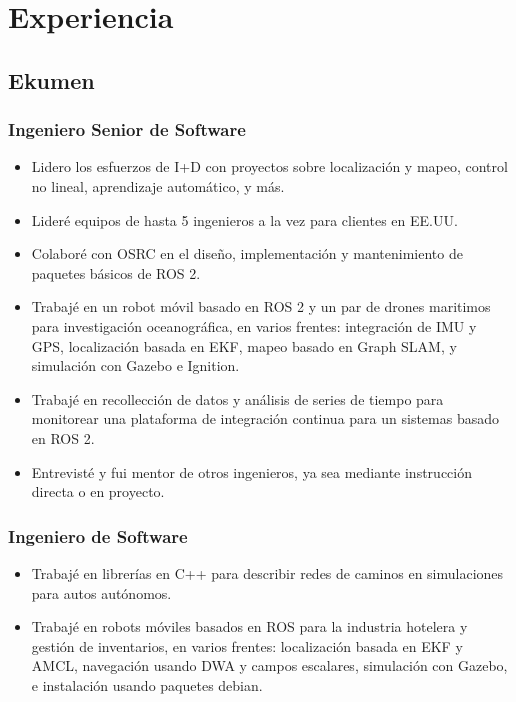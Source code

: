 \documentclass[spanish, letterpaper]{resume}
\renewcommand{\date}[2]{%
  \DTMspanishMonthname{#2} #1}
\begin{document}
\section*{Experiencia}

\subsection*[\icon{ekumen}]{Ekumen }

\subsubsection*{Ingeniero Senior de Software \thru{\date{2018}{9}}{Present}}
\begin{itemize}
  \item Lidero los esfuerzos de I+D con proyectos sobre localización y mapeo, control no lineal, aprendizaje automático, y más.
  \item Lideré equipos de hasta 5 ingenieros a la vez para clientes en EE.UU.
  \item Colaboré con OSRC en el diseño, implementación y mantenimiento de paquetes básicos de ROS 2.
  \item Trabajé en un robot móvil basado en ROS 2 y un par de drones maritimos para investigación oceanográfica, en varios frentes: integración de IMU y GPS, localización basada en EKF, mapeo basado en Graph SLAM, y simulación con Gazebo e Ignition.
  \item Trabajé en recollección de datos y análisis de series de tiempo para monitorear una plataforma de integración continua para un sistemas basado en ROS 2.
  \item Entrevisté y fui mentor de otros ingenieros, ya sea mediante instrucción directa o en proyecto.
\end{itemize}

\subsubsection*{Ingeniero de Software \thru{\date{2015}{8}}{\date{2018}{9}}}
\begin{itemize}
  \item Trabajé en librerías en C++ para describir redes de caminos en simulaciones para autos autónomos.
  \item Trabajé en robots móviles basados en ROS para la industria hotelera y gestión de inventarios, en varios frentes: localización basada en EKF y AMCL, navegación usando DWA y campos escalares, simulación con Gazebo, e instalación usando paquetes debian.
\end{itemize}
\end{document}
